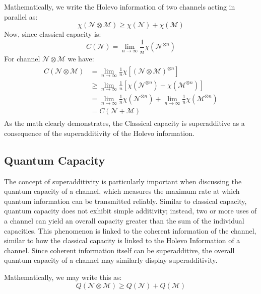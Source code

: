 Mathematically, we write the Holevo information of two channels acting in parallel as:
\begin{equation}
    \chi(\mathcal{N} \otimes \mathcal{M}) \geq \chi(\mathcal{N}) + \chi(\mathcal{M})
\end{equation}
Now, since classical capacity is:
\begin{equation}
    C(\mathcal{N}) = \lim_{n \rightarrow \infty }\frac{1}{n}\chi(\mathcal{N}^{\otimes n})
\end{equation}
For channel $\mathcal{N}\otimes\mathcal{M}$ we have:
\begin{align}\begin{split}
    C(\mathcal{N}\otimes\mathcal{M}) & = \lim_{n \rightarrow \infty }\frac{1}{n}\chi[(\mathcal{N}\otimes\mathcal{M})^{\otimes n}]\\
    & \geq \lim_{n \rightarrow \infty }\frac{1}{n}[\chi(\mathcal{N}^{\otimes n}) + \chi(\mathcal{M}^{\otimes n})]\\
    & = \lim_{n \rightarrow \infty }\frac{1}{n}\chi(\mathcal{N}^{\otimes n}) + \lim_{n \rightarrow \infty }\frac{1}{n}\chi(\mathcal{M}^{\otimes n})\\
    & = C(\mathcal{N} + \mathcal{M})
\end{split}\end{align}
As the math clearly demonstrates, the Classical capacity is superadditive as a consequence
of the superadditivity of the Holevo information.

\subsection{Quantum Capacity}
The concept of superadditivity is particularly important when discussing the quantum capacity
of a channel, which measures the maximum rate at which quantum information can be transmitted
reliably. Similar to classical capacity, quantum capacity does not exhibit simple additivity;
instead, two or more uses of a channel can yield an overall capacity greater than the sum of
the individual capacities. This phenomenon is linked to the coherent information of the
channel, similar to how the classical capacity is linked to the Holevo Information of a channel.
Since coherent information itself can be superadditive, the overall quantum capacity of a
channel may similarly display superadditivity.

Mathematically, we may write this as:
\begin{equation}
    Q(\mathcal{N} \otimes \mathcal{M}) \geq Q(\mathcal{N}) + Q(\mathcal{M})
\end{equation}

